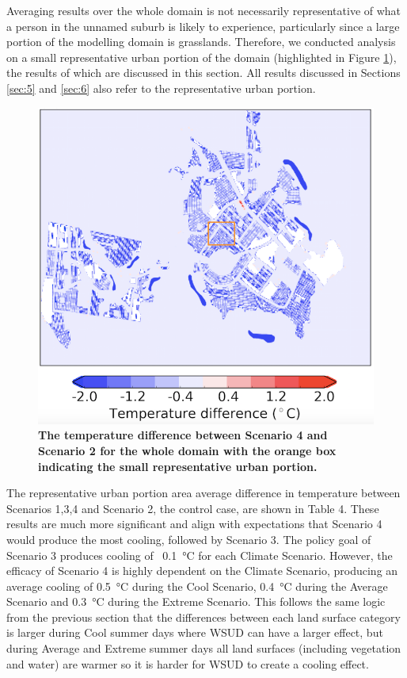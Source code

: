 \documentclass[final,3p,times,authoryear]{elsarticle}
\begin{document}
Averaging results over the whole domain is not necessarily representative of what a person in the unnamed suburb is likely to experience, particularly since a large portion of the modelling domain is grasslands. Therefore, we conducted analysis on a small representative urban portion of the domain (highlighted in Figure \ref{fig:fig2}), the results of which are discussed in this section. All results discussed in Sections \ref{sec:5} and \ref{sec:6} also refer to the representative urban portion.


\begin{figure}[!htbp]
\centering   
\includegraphics[scale=0.40]{images/fig2}
\caption{\bf The temperature difference between Scenario 4 and Scenario 2 for the whole domain with the orange box indicating the small representative urban portion.}    
 \label{fig:fig2} 
\end{figure}

The representative urban portion area average difference in temperature between Scenarios 1,3,4 and Scenario 2, the control case, are shown in Table 4. These results are much more significant and align with expectations that Scenario 4 would produce the most cooling, followed by Scenario 3. The policy goal of Scenario 3 produces cooling of ~0.1\SI{}{\degreeCelsius} for each Climate Scenario. However, the efficacy of Scenario 4 is highly dependent on the Climate Scenario, producing an average cooling of 0.5\SI{}{\degreeCelsius} during the Cool Scenario, 0.4\SI{}{\degreeCelsius} during the Average Scenario and 0.3\SI{}{\degreeCelsius} during the Extreme Scenario. This follows the same logic from the previous section that the differences between each land surface category is larger during Cool summer days where WSUD can have a larger effect, but during Average and Extreme summer days all land surfaces (including vegetation and water) are warmer so it is harder for WSUD to create a cooling effect.
\end{document}
